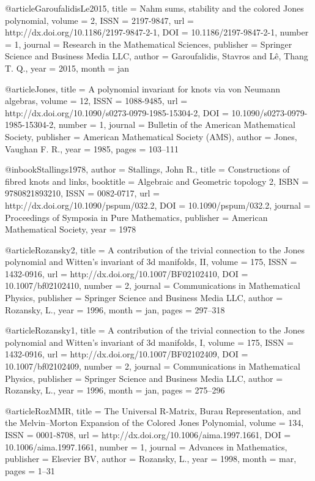 @article{GaroufalidisLe2015,
  title = {Nahm sums,  stability and the colored {Jones} polynomial},
  volume = {2},
  ISSN = {2197-9847},
  url = {http://dx.doi.org/10.1186/2197-9847-2-1},
  DOI = {10.1186/2197-9847-2-1},
  number = {1},
  journal = {Research in the Mathematical Sciences},
  publisher = {Springer Science and Business Media LLC},
  author = {Garoufalidis,  Stavros and L\^e,  Thang T. Q.},
  year = {2015},
  month = jan 
}

@article{Jones,
  title = {A polynomial invariant for knots via von Neumann algebras},
  volume = {12},
  ISSN = {1088-9485},
  url = {http://dx.doi.org/10.1090/s0273-0979-1985-15304-2},
  DOI = {10.1090/s0273-0979-1985-15304-2},
  number = {1},
  journal = {Bulletin of the American Mathematical Society},
  publisher = {American Mathematical Society (AMS)},
  author = {Jones,  Vaughan F. R.},
  year = {1985},
  pages = {103--111}
}

@inbook{Stallings1978,
  author = {Stallings, John R.},
  title = {Constructions of fibred knots and links},
  booktitle = {Algebraic and Geometric topology 2},
  ISBN = {9780821893210},
  ISSN = {0082-0717},
  url = {http://dx.doi.org/10.1090/pspum/032.2},
  DOI = {10.1090/pspum/032.2},
  journal = {Proceedings of Symposia in Pure Mathematics},
  publisher = {American Mathematical Society},
  year = {1978}
}

@article{Rozansky2,
  title = {A contribution of the trivial connection to the {Jones} polynomial and {Witten’s} invariant of 3d manifolds,  II},
  volume = {175},
  ISSN = {1432-0916},
  url = {http://dx.doi.org/10.1007/BF02102410},
  DOI = {10.1007/bf02102410},
  number = {2},
  journal = {Communications in Mathematical Physics},
  publisher = {Springer Science and Business Media LLC},
  author = {Rozansky,  L.},
  year = {1996},
  month = jan,
  pages = {297--318}
}

@article{Rozansky1,
  title = {A contribution of the trivial connection to the {Jones} polynomial and {Witten’s} invariant of 3d manifolds,  I},
  volume = {175},
  ISSN = {1432-0916},
  url = {http://dx.doi.org/10.1007/BF02102409},
  DOI = {10.1007/bf02102409},
  number = {2},
  journal = {Communications in Mathematical Physics},
  publisher = {Springer Science and Business Media LLC},
  author = {Rozansky,  L.},
  year = {1996},
  month = jan,
  pages = {275--296}
}

@article{RozMMR,
  title = {The Universal R-Matrix,  {Burau} Representation,  and the {Melvin--Morton} Expansion of the Colored {Jones} Polynomial},
  volume = {134},
  ISSN = {0001-8708},
  url = {http://dx.doi.org/10.1006/aima.1997.1661},
  DOI = {10.1006/aima.1997.1661},
  number = {1},
  journal = {Advances in Mathematics},
  publisher = {Elsevier BV},
  author = {Rozansky,  L.},
  year = {1998},
  month = mar,
  pages = {1--31}
}

